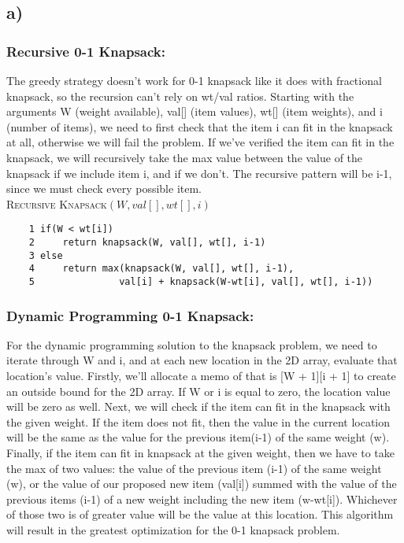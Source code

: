 \documentclass{article}
\begin{document}
\subsection*{a)}

\subsubsection*{Recursive 0-1 Knapsack:}

The greedy strategy doesn't work for 0-1 knapsack like it does with fractional knapsack, so the recursion can't rely on wt/val ratios.  Starting with the arguments W (weight available), val[] (item values), wt[] (item weights), and i (number of items), we need to first check that the item i can fit in the knapsack at all, otherwise we will fail the problem.  If we've verified the item can fit in the knapsack, we will recursively take the max value between the value of the knapsack if we include item i, and if we don't.  The recursive pattern will be i-1, since we must check every possible item.\\

\textsc{Recursive Knapsack$(W, val[], wt[], i)$}

\begin{verbatim}
    1 if(W < wt[i])
    2     return knapsack(W, val[], wt[], i-1)
    3 else
    4     return max(knapsack(W, val[], wt[], i-1),
    5               val[i] + knapsack(W-wt[i], val[], wt[], i-1))
\end{verbatim}

\subsubsection*{Dynamic Programming 0-1 Knapsack:}

For the dynamic programming solution to the knapsack problem, we need to iterate through W and i, and at each new location in the 2D array, evaluate that location's value.  Firstly, we'll allocate a memo of that is [W + 1][i + 1] to create an outside bound for the 2D array. If W or i is equal to zero, the location value will be zero as well.  Next, we will check if the item can fit in the knapsack with the given weight.  If the item does not fit, then the value in the current location will be the same as the value for the previous item(i-1) of the same weight (w).  Finally, if the item can fit in knapsack at the given weight, then we have to take the max of two values: the value of the previous item (i-1) of the same weight (w), or the value of our proposed new item (val[i]) summed with the value of the previous items (i-1) of a new weight including the new item (w-wt[i]).  Whichever of those two is of greater value will be the value at this location.  This algorithm will result in the greatest optimization for the 0-1 knapsack problem.
\end{document}
